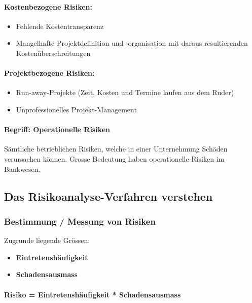 \documentclass[10pt,a4paper]{article}
\begin{document}
\paragraph*{Kostenbezogene Risiken:}
\begin{itemize}[noitemsep,topsep=0pt,leftmargin=*]
    \item Fehlende Kostentransparenz
    \item Mangelhafte Projektdefinition und -organisation mit
    daraus resultierenden Kostenüberschreitungen
\end{itemize}

\paragraph*{Projektbezogene Risiken:}
\begin{itemize}[noitemsep,topsep=0pt,leftmargin=*]
    \item Run-away-Projekte (Zeit, Kosten und Termine laufen aus
    dem Ruder)
    \item Unprofessionelles Projekt-Management
\end{itemize}


\paragraph*{Begriff: Operationelle Risiken} Sämtliche betrieblichen Risiken, welche in einer Unternehmung Schäden verursachen können.
Grosse Bedeutung haben operationelle Risiken im Bankwesen.

\subsection*{Das Risikoanalyse-Verfahren verstehen}

\subsubsection*{Bestimmung / Messung von Risiken}

Zugrunde liegende Grössen:
\begin{itemize}[noitemsep,topsep=0pt,leftmargin=*]
    \item \textbf{Eintretenshäufigkeit}
    \item \textbf{Schadensausmass}
\end{itemize}

\paragraph*{Risiko = Eintretenshäufigkeit * Schadensausmass}
\end{document}

